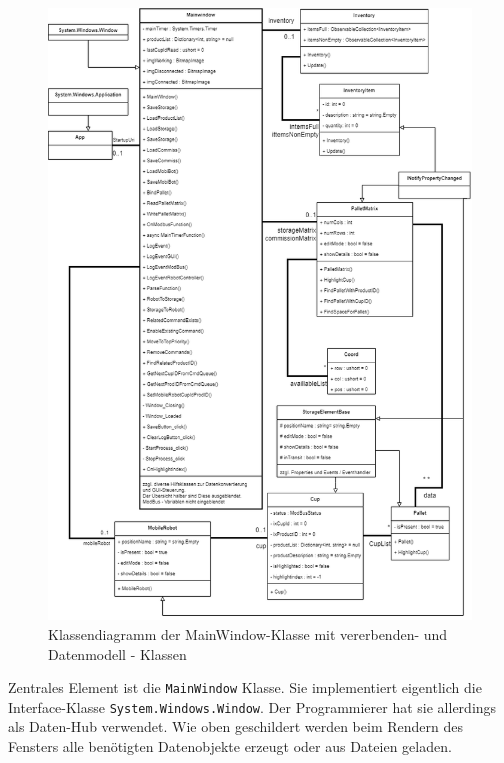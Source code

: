     \begin{figure}
        \caption[Klassendiagramm Datenmodells ]
        {\small Klassendiagramm der MainWindow-Klasse mit vererbenden- und Datenmodell - Klassen }\label{fig:figure2}
        \includegraphics[width = \textwidth ]{Bilder/LV_Klassendiagramm_Datenmodell}
        \centering
    \end{figure}
    \newpage
    Zentrales Element ist die \verb|MainWindow| Klasse.
    Sie implementiert eigentlich die Interface-Klasse \verb|System.Windows.Window|.
    Der Programmierer hat sie allerdings als Daten-Hub verwendet.
    Wie oben geschildert werden beim Rendern des Fensters alle benötigten Datenobjekte erzeugt oder aus Dateien geladen.
